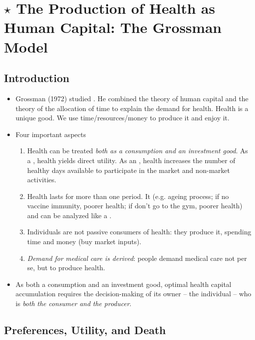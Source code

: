 \section{$\star$ The Production of Health as Human Capital: The Grossman Model}

    \subsection{Introduction}
    
        \begin{itemize}
            \item Grossman (1972) studied . He combined the theory of human capital and the theory of the allocation of time to explain the demand for health. Health is a unique good. We use time/resources/money to produce it and enjoy it.
            \item Four important aspects
            \begin{enumerate}
                    \item Health can be treated \emph{both as a consumption and an investment good}. As a , health yields direct utility. As an , health increases the number of healthy days available to participate in the market and non-market activities.
                    \item Health lasts for more than one period. It  (e.g. ageing process; if no vaccine immunity, poorer health; if don't go to the gym, poorer health) and can be analyzed like a .
                    \item Individuals are not passive consumers of health: they produce it, spending time and money (buy market inputs).
                    \item \emph{Demand for medical care is derived}: people demand medical care not per se, but to produce health.
                \end{enumerate}
            \item As both a consumption and an investment good, optimal health capital accumulation requires the decision-making of its owner – the individual – who is \emph{both the consumer and the producer}.    
        \end{itemize}        

    \subsection{Preferences, Utility, and Death}
    

